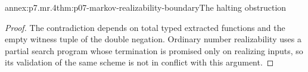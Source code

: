 \begin{annexitem}{annex:p7.mr.4}{thm:p07-markov-realizability-boundary}{The halting obstruction}
\begin{proof}
The contradiction depends on total typed extracted functions and the
empty witness tuple of the double negation. Ordinary number realizability
uses a partial search program whose termination is promised only on
realizing inputs, so its validation of the same scheme is not in
conflict with this argument.
\end{proof}
\end{annexitem}
